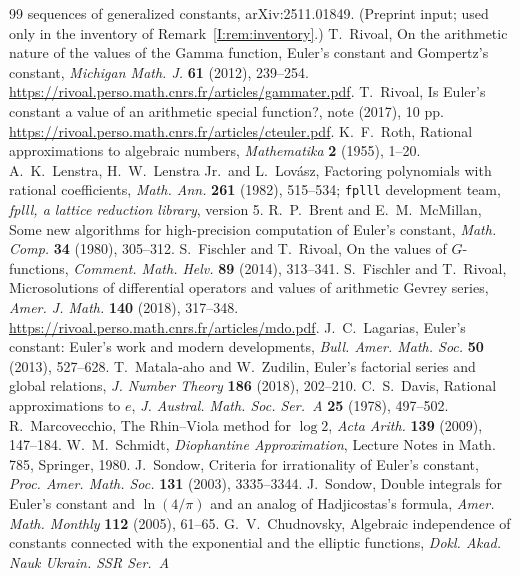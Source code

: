 \documentclass[11pt,a4paper]{article}
\theoremstyle{definition}
\theoremstyle{remark}
\numberwithin{equation}{section}
\begin{document}
\begin{thebibliography}{99}
sequences of generalized constants, arXiv:2511.01849. (Preprint input; used only in the
inventory of Remark~\ref{I:rem:inventory}.)
 T.~Rivoal, On the arithmetic nature of the values of the Gamma
function, Euler's constant and Gompertz's constant, \emph{Michigan Math. J.} \textbf{61}
(2012), 239--254. \url{https://rivoal.perso.math.cnrs.fr/articles/gammater.pdf}.
 T.~Rivoal, Is Euler's constant a value of an arithmetic special
function?, note (2017), 10 pp. \url{https://rivoal.perso.math.cnrs.fr/articles/cteuler.pdf}.
 K.~F.~Roth, Rational approximations to algebraic numbers,
\emph{Mathematika} \textbf{2} (1955), 1--20.
 A.~K.~Lenstra, H.~W.~Lenstra Jr.\ and L.~Lov\'asz, Factoring polynomials with
rational coefficients, \emph{Math. Ann.} \textbf{261} (1982), 515--534; \texttt{fplll}
development team, \emph{fplll, a lattice reduction library}, version 5.
 R.~P.~Brent and E.~M.~McMillan, Some new algorithms for high-precision
computation of Euler's constant, \emph{Math. Comp.} \textbf{34} (1980), 305--312.
 S.~Fischler and T.~Rivoal, On the values of $G$-functions,
\emph{Comment. Math. Helv.} \textbf{89} (2014), 313--341.
 S.~Fischler and T.~Rivoal, Microsolutions of differential operators and
values of arithmetic Gevrey series, \emph{Amer. J. Math.} \textbf{140} (2018), 317--348.
\url{https://rivoal.perso.math.cnrs.fr/articles/mdo.pdf}.
 J.~C.~Lagarias, Euler's constant: Euler's work and modern developments,
\emph{Bull. Amer. Math. Soc.} \textbf{50} (2013), 527--628.
 T.~Matala-aho and W.~Zudilin, Euler's factorial series and global relations,
\emph{J. Number Theory} \textbf{186} (2018), 202--210.
 C.~S.~Davis, Rational approximations to $e$, \emph{J. Austral. Math. Soc.
Ser.~A} \textbf{25} (1978), 497--502.
 R.~Marcovecchio, The Rhin--Viola method for $\log2$,
\emph{Acta Arith.} \textbf{139} (2009), 147--184.
 W.~M.~Schmidt, \emph{Diophantine Approximation}, Lecture Notes in Math.
785, Springer, 1980.
 J.~Sondow, Criteria for irrationality of Euler's constant,
\emph{Proc. Amer. Math. Soc.} \textbf{131} (2003), 3335--3344.
 J.~Sondow, Double integrals for Euler's constant and $\ln(4/\pi)$
and an analog of Hadjicostas's formula, \emph{Amer. Math. Monthly} \textbf{112} (2005),
61--65.
 G.~V.~Chudnovsky, Algebraic independence of constants connected with
the exponential and the elliptic functions, \emph{Dokl. Akad. Nauk Ukrain. SSR Ser.~A}

\end{thebibliography}
\end{document}
